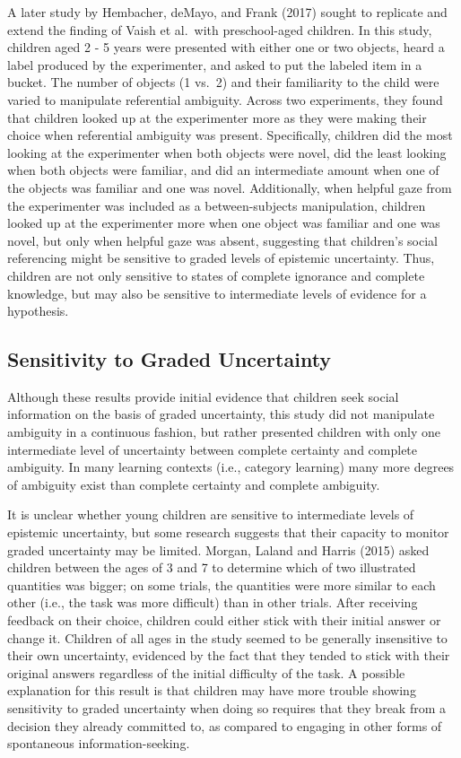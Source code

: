 \documentclass[,man,floatsintext]{apa6}
\begin{document}
A later study by Hembacher, deMayo, and Frank (2017) sought to replicate and extend the finding of Vaish et al.~with preschool-aged children. In this study, children aged 2 - 5 years were presented with either one or two objects, heard a label produced by the experimenter, and asked to put the labeled item in a bucket. The number of objects (1 vs.~2) and their familiarity to the child were varied to manipulate referential ambiguity. Across two experiments, they found that children looked up at the experimenter more as they were making their choice when referential ambiguity was present. Specifically, children did the most looking at the experimenter when both objects were novel, did the least looking when both objects were familiar, and did an intermediate amount when one of the objects was familiar and one was novel. Additionally, when helpful gaze from the experimenter was included as a between-subjects manipulation, children looked up at the experimenter more when one object was familiar and one was novel, but only when helpful gaze was absent, suggesting that children's social referencing might be sensitive to graded levels of epistemic uncertainty. Thus, children are not only sensitive to states of complete ignorance and complete knowledge, but may also be sensitive to intermediate levels of evidence for a hypothesis.

\hypertarget{sensitivity-to-graded-uncertainty}{%
\subsection{Sensitivity to Graded Uncertainty}\label{sensitivity-to-graded-uncertainty}}

Although these results provide initial evidence that children seek social information on the basis of graded uncertainty, this study did not manipulate ambiguity in a continuous fashion, but rather presented children with only one intermediate level of uncertainty between complete certainty and complete ambiguity. In many learning contexts (i.e., category learning) many more degrees of ambiguity exist than complete certainty and complete ambiguity.

It is unclear whether young children are sensitive to intermediate levels of epistemic uncertainty, but some research suggests that their capacity to monitor graded uncertainty may be limited. Morgan, Laland and Harris (2015) asked children between the ages of 3 and 7 to determine which of two illustrated quantities was bigger; on some trials, the quantities were more similar to each other (i.e., the task was more difficult) than in other trials. After receiving feedback on their choice, children could either stick with their initial answer or change it. Children of all ages in the study seemed to be generally insensitive to their own uncertainty, evidenced by the fact that they tended to stick with their original answers regardless of the initial difficulty of the task. A possible explanation for this result is that children may have more trouble showing sensitivity to graded uncertainty when doing so requires that they break from a decision they already committed to, as compared to engaging in other forms of spontaneous information-seeking.
\end{document}

